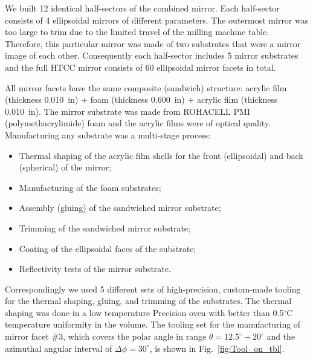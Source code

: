 We built 12 identical half-sectors of the combined mirror. Each half-sector consists of 4 ellipsoidal mirrors of
different parameters. The outermost mirror was too large to trim due to the limited travel of the milling machine
table. Therefore, this particular mirror was made of two substrates that were a mirror image of each other.
Consequently each half-sector includes 5 mirror substrates and the full HTCC mirror consists of 60 ellipsoidal
mirror facets in total. 

All mirror facets have the same composite (sandwich) structure: acrylic film (thickness 0.010~in) + foam (thickness
0.600~in) + acrylic film (thickness 0.010~in). The mirror substrate was made from ROHACELL PMI
(polymethacrylimide) foam and the acrylic films were of optical quality. Manufacturing any substrate was a
multi-stage process:
\begin{itemize}
    \item Thermal shaping of the acrylic film shells for the front (ellipsoidal) and back (spherical) of the mirror;
    \item Manufacturing of the foam substrates;
    \item Assembly (gluing) of the sandwiched mirror substrate;
    \item Trimming of the sandwiched mirror substrate;
    \item Coating of the ellipsoidal faces of the substrate;
    \item Reflectivity tests of the mirror substrate.
    \end{itemize}

Correspondingly we used 5 different sets of high-precision, custom-made tooling for the thermal shaping, gluing,
and trimming of the substrates. The thermal shaping was done in a low temperature Precision oven with better than
0.5$^\circ$C  temperature uniformity in the volume. The tooling set for the manufacturing of mirror facet \#3,
which covers the polar angle in range $\theta = 12.5^\circ - 20^\circ$ and the azimuthal angular interval of
$\Delta \phi = 30^\circ$, is shown in Fig.~\ref{fig:Tool_on_tbl}.

